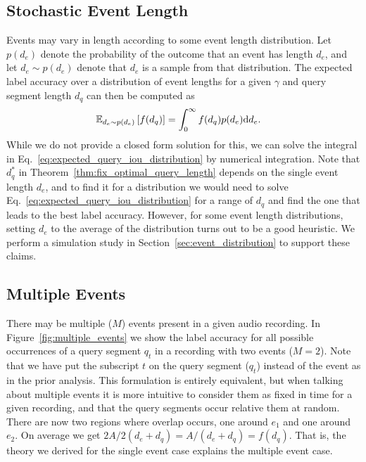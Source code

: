 \subsection{Stochastic Event Length}
\label{sec:theory_event_distribution}
Events may vary in length according to some event length distribution. Let $p(d_e)$ denote the probability of the outcome that an event has length $d_e$, and let $d_e\sim p(d_e)$ denote that $d_e$ is a sample from that distribution. The expected label accuracy over a distribution of event lengths for a given $\gamma$ and query segment length $d_q$ can then be computed as
\begin{align}
\mathbb{E}_{d_e\sim p(d_e)}\left[f(d_q)\right]
\label{eq:expected_query_iou_distribution}
&= \int_{0}^{\infty} f(d_q)p(d_e) \mathrm{d}d_e.
\end{align}
While we do not provide a closed form solution for this, we can solve the integral in Eq.~\ref{eq:expected_query_iou_distribution} by numerical integration. Note that $d_q^*$ in Theorem~\ref{thm:fix_optimal_query_length} depends on the single event length $d_e$, and to find it for a distribution we would need to solve Eq.~\ref{eq:expected_query_iou_distribution} for a range of $d_q$ and find the one that leads to the best label accuracy. However, for some event length distributions, setting $d_e$ to the average of the distribution turns out to be a good heuristic. We perform a simulation study in Section~\ref{sec:event_distribution} to support these claims.



\subsection{Multiple Events}
\label{sec:theory_multi_events}
There may be multiple ($M$) events present in a given audio recording. In Figure~\ref{fig:multiple_events} we show the label accuracy for all possible occurrences of a query segment $q_t$ in a recording with two events ($M=2$). Note that we have put the subscript $t$ on the query segment ($q_t$) instead of the event as in the prior analysis. This formulation is entirely equivalent, but when talking about multiple events it is more intuitive to consider them as fixed in time for a given recording, and that the query segments occur relative them at random. There are now two regions where overlap occurs, one around $e_1$ and one around $e_2$. On average we get $2A/2(d_e + d_q) = A/(d_e + d_q) = f(d_q)$. That is, the theory we derived for the single event case explains the multiple event case.

